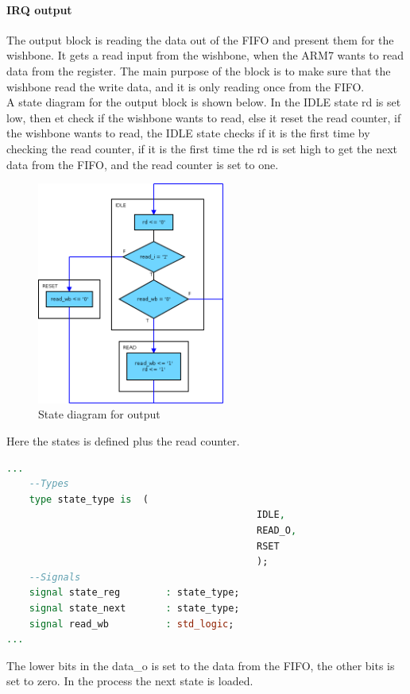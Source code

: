 \paragraph{IRQ output}
The output block is reading the data out of the FIFO and present them for the wishbone. It gets a read input from the wishbone, when the ARM7 wants to read data from the register. The main purpose of the block is to make sure that the wishbone read the write data, and it is only reading once from the FIFO.\\
A state diagram for the output block is shown below. In the IDLE state rd is set low, then et check if the wishbone wants to read, else it reset the read counter, if the wishbone wants to read, the IDLE state checks if it is the first time by checking the read counter, if it is the first time the rd is set high to get the next data from the FIFO, and the read counter is set to one.
\begin{figure}[H]
	\begin{centering}
		\includegraphics[width=0.55\textwidth]{images/tb5_irq_output_state.png}
		\caption{State diagram for output}
	\end{centering}
\end{figure}
Here the states is defined plus the read counter.
\begin{lstlisting}[language=VHDL]
...
	--Types
	type state_type is	(
											IDLE,
											READ_O,
											RSET
											);
	--Signals
	signal state_reg		: state_type;
	signal state_next		: state_type;
	signal read_wb			: std_logic;
...
\end{lstlisting}
The lower bits in the data\_o is set to the data from the FIFO, the other bits is set to zero. In the process the next state is loaded.
